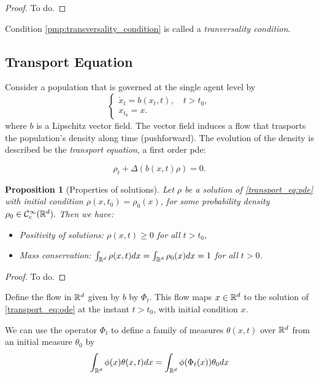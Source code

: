 \documentclass{article}
\newtheorem{proposition}{Proposition}
\begin{document}
\begin{proof}
    To do.
\end{proof}

Condition \eqref{pmp:transversality_condition} is called a \textit{tranversality condition}.

\subsection{Transport Equation}\label{transport_eq}
Consider a population that is governed at the single agent level by
\begin{equation}\label{transport_eq:ode}
\begin{cases}
    \dot x_t = b(x_t,t), \quad t > t_0,\\
    x_{t_0} = x.
\end{cases}
\end{equation}
where $b$ is a Lipschitz vector field. The vector field induces a flow that trasports the population's density along time (pushforward). The evolution of the density is described be the \textit{transport equation}, a first order pde:  

\begin{equation}\label{transport_eq:pde}
\rho_t + \Delta(b(x,t) \rho) = 0.
\end{equation}

\begin{proposition}[Properties of solutions]    
Let $\rho$ be a solution of \eqref{transport_eq:pde} with initial condition $\rho(x,t_0) = \rho_0(x)$, for some probability density $\rho_0 \in \mathcal{C}_c^\infty (\mathbb{R}^d).$ Then we have:
\begin{itemize}
    \item Positivity of solutions: $\rho(x,t) \geq 0$ for all $t> t_0$,
    \item Mass conservation: $\int_{\mathbb{R}^d} \rho(x,t) dx = \int_{\mathbb{R}^d} \rho_0(x) dx = 1$ for all $t > 0$.
\end{itemize}
\end{proposition}

\begin{proof}
    To do.
\end{proof}

Define the flow in $\mathbb{R}^d$ given by $b$ by $\Phi_t$. This flow maps $x\in \mathbb{R}^d$ to the solution of \eqref{transport_eq:ode} at the instant $t > t_0$, with initial condition $x$.

We can use the operator $\Phi_t$ to define a family of measures $\theta(x,t)$ over $\mathbb{R}^d$ from an initial measure $\theta_0$ by 
\begin{equation}\label{transport_eq:family_of_measures}
\int_{\mathbb{R}^d} \phi(x) \theta(x,t) dx = \int_{\mathbb{R}^d} \phi(\Phi_t(x)) \theta_0 dx    
\end{equation}
\end{document}
